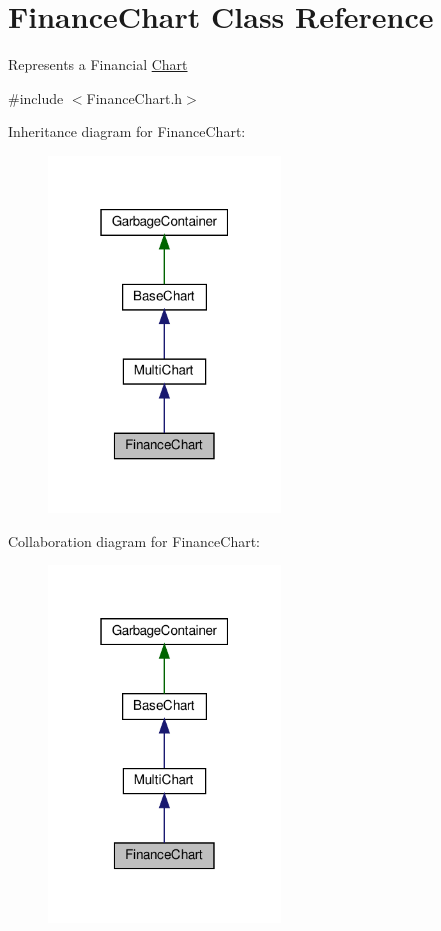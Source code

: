 \hypertarget{class_finance_chart}{}\section{Finance\+Chart Class Reference}
\label{class_finance_chart}


Represents a Financial \hyperlink{namespace_chart}{Chart}  




{\ttfamily \#include $<$Finance\+Chart.\+h$>$}



Inheritance diagram for Finance\+Chart\+:
\nopagebreak
\begin{figure}[H]
\begin{center}
\leavevmode
\includegraphics[width=175pt]{class_finance_chart__inherit__graph}
\end{center}
\end{figure}


Collaboration diagram for Finance\+Chart\+:
\nopagebreak
\begin{figure}[H]
\begin{center}
\leavevmode
\includegraphics[width=175pt]{class_finance_chart__coll__graph}
\end{center}
\end{figure}
